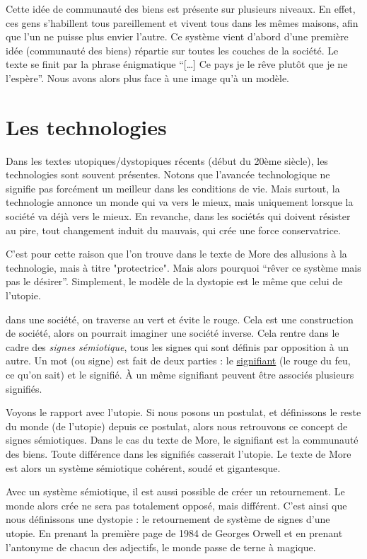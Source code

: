 \documentclass[12pt,a4paper]{book}
\begin{document}
Cette idée de communauté des biens est présente sur plusieurs niveaux. En effet, ces gens s'habillent tous pareillement et vivent tous dans les mêmes maisons, afin que l'un ne puisse plus envier l'autre. Ce système vient d'abord d'une première idée (communauté des biens) répartie sur toutes les couches de la société. Le texte se finit par la phrase énigmatique ``[\ldots] Ce pays je le rêve plutôt que je ne l'espère''. Nous avons alors plus face à une image qu'à un modèle. 

\section{Les technologies}
Dans les textes utopiques/dystopiques récents (début du 20ème siècle), les technologies sont souvent présentes. Notons que l'avancée technologique ne signifie pas forcément un meilleur dans les conditions de vie. Mais surtout, la technologie annonce un monde qui va vers le mieux, mais uniquement lorsque la société va déjà vers le mieux. En revanche, dans les sociétés qui doivent résister au pire, tout changement induit du mauvais, qui crée une force conservatrice.

C'est pour cette raison que l'on trouve dans le texte de More des allusions à la technologie, mais à titre "protectrice". Mais alors pourquoi ``rêver ce système mais pas le désirer''. Simplement, le modèle de la dystopie est le même que celui de l'utopie. 

 dans une société, on traverse au vert et évite le rouge. Cela est une construction de société, alors on pourrait imaginer une société inverse. Cela rentre dans le cadre des \textit{signes sémiotique}, tous les signes qui sont définis par opposition à un autre. Un mot (ou signe) est fait de deux parties : le \uline{signifiant} (le rouge du feu, ce qu'on sait) et le signifié. À un même signifiant peuvent être associés plusieurs signifiés. 

Voyons le rapport avec l'utopie. Si nous posons un postulat, et définissons le reste du monde (de l'utopie) depuis ce postulat, alors nous retrouvons ce concept de signes sémiotiques. Dans le cas du texte de More, le signifiant est la communauté des biens. Toute différence dans les signifiés casserait l'utopie. Le texte de More est alors un système sémiotique cohérent, soudé et gigantesque. 

Avec un système sémiotique, il est aussi possible de créer un retournement. Le monde alors crée ne sera pas totalement opposé, mais différent. C'est ainsi que nous définissons une dystopie : le retournement de système de signes d'une utopie. En prenant la première page de 1984 de Georges Orwell et en prenant l'antonyme de chacun des adjectifs, le monde passe de terne à magique. 
\end{document}
